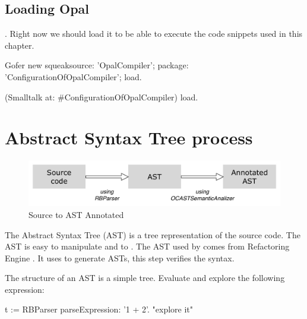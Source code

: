 \documentclass[a4paper,10pt,twoside]{book}
\begin{document}
\subsection{Loading Opal}

 . Right now we should load it to be able to execute the code snippets used in this chapter.

\begin{code}{}
	Gofer new
		squeaksource: 'OpalCompiler';
		package: 'ConfigurationOfOpalCompiler';
		load.
		
	(Smalltalk at: #ConfigurationOfOpalCompiler) load.
\end{code}


\section{Abstract Syntax Tree process}


\begin{figure}[ht]\centering
	\includegraphics[width=\linewidth]{SourceToAnnotatedAST}
	\caption{Source to AST Annotated  }
\end{figure}

The Abstract Syntax Tree (AST) is a tree representation of the source code. The AST is easy to manipulate and to  . The AST used by \opal comes from Refactoring Engine . It uses  to generate ASTs, this step verifies the syntax.

The structure of an AST is a simple tree. Evaluate and explore the following expression:

\begin{code}{}
t := RBParser parseExpression: '1 + 2'.
"explore it"

\end{code}
\end{document}
